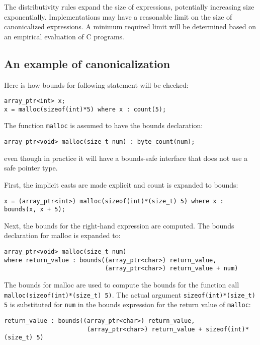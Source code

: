 The distributivity rules expand the size of expressions, potentially
increasing size exponentially. Implementations may have a reasonable
limit on the size of canonicalized expressions. A minimum required limit
will be determined based on an empirical evaluation of C programs.

\subsection{An example of canonicalization}

Here is how bounds for following statement will be checked:
\begin{verbatim}
array_ptr<int> x;
x = malloc(sizeof(int)*5) where x : count(5);
\end{verbatim}

The function \verb+malloc+ is assumed to have the bounds declaration:

\begin{verbatim}
array_ptr<void> malloc(size_t num) : byte_count(num);
\end{verbatim}

even though in practice it will have a bounds-safe interface that does
not use a safe pointer type.

First, the implicit casts are made explicit and count is expanded to bounds:

\begin{verbatim}
x = (array_ptr<int>) malloc(sizeof(int)*(size_t) 5) where x : bounds(x, x + 5);
\end{verbatim}

Next, the bounds for the right-hand expression are computed. The bounds
declaration for malloc is expanded to:
\begin{verbatim}
array_ptr<void> malloc(size_t num)  
where return_value : bounds((array_ptr<char>) return_value, 
                            (array_ptr<char>) return_value + num)
\end{verbatim}

The bounds for malloc are used to compute the bounds for the function
call \verb+malloc(sizeof(int)*(size_t) 5)+. The actual argument
\verb+sizeof(int)*(size_t) 5+ is substituted for \verb+num+ in the
bounds expression for the return value of \verb+malloc+:
\begin{verbatim}
return_value : bounds((array_ptr<char>) return_value, 
                       (array_ptr<char>) return_value + sizeof(int)*(size_t) 5)
\end{verbatim}

